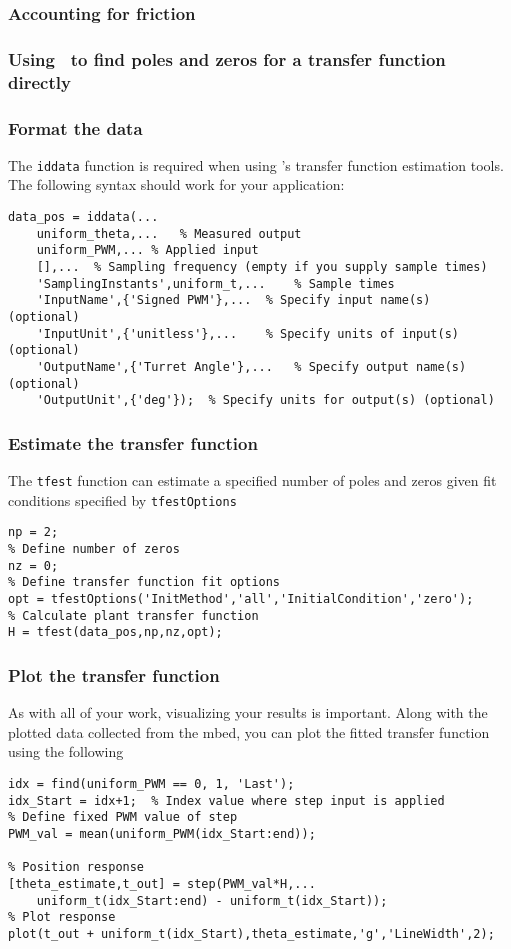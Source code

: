\documentclass[aspectratio=169]{beamer}
\begin{document}
\begin{frame}
\frametitle{Accounting for friction}
\end{frame}

\begin{frame}
\frametitle{Using \Matlab\ to find poles and zeros for a transfer function directly}
\end{frame}

\begin{frame}[fragile]
\frametitle{Format the data}
The \lstinline{iddata} function is required when using \Matlab's transfer function estimation tools. The following syntax should work for your application:
\begin{lstlisting}[style=usnaMatlab]
data_pos = iddata(...
	uniform_theta,...	% Measured output  
	uniform_PWM,...	% Applied input
	[],...	% Sampling frequency (empty if you supply sample times)
	'SamplingInstants',uniform_t,...	% Sample times
	'InputName',{'Signed PWM'},...	% Specify input name(s)       (optional)
	'InputUnit',{'unitless'},...	% Specify units of input(s)   (optional)
	'OutputName',{'Turret Angle'},...	% Specify output name(s)      (optional)
	'OutputUnit',{'deg'});	% Specify units for output(s) (optional)
\end{lstlisting}
\end{frame}

\begin{frame}[fragile]
\frametitle{Estimate the transfer function}
The \lstinline{tfest} function can estimate a specified number of poles and zeros given fit conditions specified by \lstinline{tfestOptions}
\begin{lstlisting}[style=usnaMatlab]
% Define number of poles
np = 2;
% Define number of zeros
nz = 0;
% Define transfer function fit options
opt = tfestOptions('InitMethod','all','InitialCondition','zero');
% Calculate plant transfer function
H = tfest(data_pos,np,nz,opt);
\end{lstlisting}
\end{frame}

\begin{frame}[fragile]
\frametitle{Plot the transfer function}
As with all of your work, visualizing your results is important.
Along with the plotted data collected from the mbed, you can plot the fitted transfer function using the following
\begin{lstlisting}[style=usnaMatlab]
% Find where step is initiated
idx = find(uniform_PWM == 0, 1, 'Last');
idx_Start = idx+1;  % Index value where step input is applied
% Define fixed PWM value of step
PWM_val = mean(uniform_PWM(idx_Start:end));
 
% Position response
[theta_estimate,t_out] = step(PWM_val*H,...
    uniform_t(idx_Start:end) - uniform_t(idx_Start));
% Plot response
plot(t_out + uniform_t(idx_Start),theta_estimate,'g','LineWidth',2);
\end{lstlisting}
\end{frame}
\end{document}
